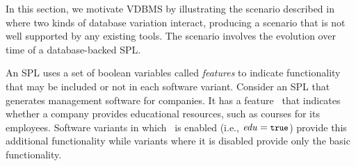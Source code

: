 


In this section, we motivate VDBMS by illustrating the scenario described in
 where two kinds of database variation interact, producing a
scenario that is not well supported by any existing tools. The scenario
involves the evolution over time of a database-backed SPL.


An SPL uses a set of boolean variables called \emph{features} 
to indicate functionality that may be included or not in each software
variant.
Consider an SPL that generates management software for companies. 
It has a feature \edu\ that 
indicates whether a company
provides educational resources, such as courses for its 
employees.
Software variants in which \edu\ is enabled (i.e., $\edu=\t$) provide this
additional functionality while variants where it is disabled provide only the
basic functionality.


